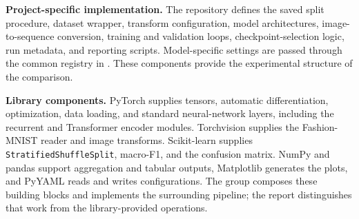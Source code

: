 \textbf{Project-specific implementation.} The repository defines the saved split procedure, dataset wrapper, transform configuration, model architectures, image-to-sequence conversion, training and validation loops, checkpoint-selection logic, run metadata, and reporting scripts. Model-specific settings are passed through the common registry in . These components provide the experimental structure of the comparison.

\textbf{Library components.} PyTorch supplies tensors, automatic differentiation, optimization, data loading, and standard neural-network layers, including the recurrent and Transformer encoder modules. Torchvision supplies the Fashion-MNIST reader and image transforms. Scikit-learn supplies \texttt{Stratified\-Shuffle\-Split}, macro-F1, and the confusion matrix. NumPy and pandas support aggregation and tabular outputs, Matplotlib generates the plots, and PyYAML reads and writes configurations. The group composes these building blocks and implements the surrounding pipeline; the report distinguishes that work from the library-provided operations.
